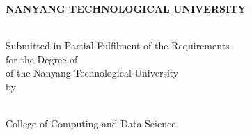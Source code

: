 \makeatletter
\begin{titlepage}
\begin{center}

\uppercase{\textbf{\large{Nanyang Technological University}}}
\\[6cm]

\uppercase{\textbf{\fypcode \\[0.3cm]\@title}}

\vfill

Submitted in Partial Fulfilment of the Requirements\\
for the Degree of \degree\\
of the Nanyang Technological University
\\[0.8cm]
by
\\[0.8cm]

\@author
\\[2cm]

\end{center}

College of Computing and Data Science\\
\@date
\end{titlepage}
\makeatother
